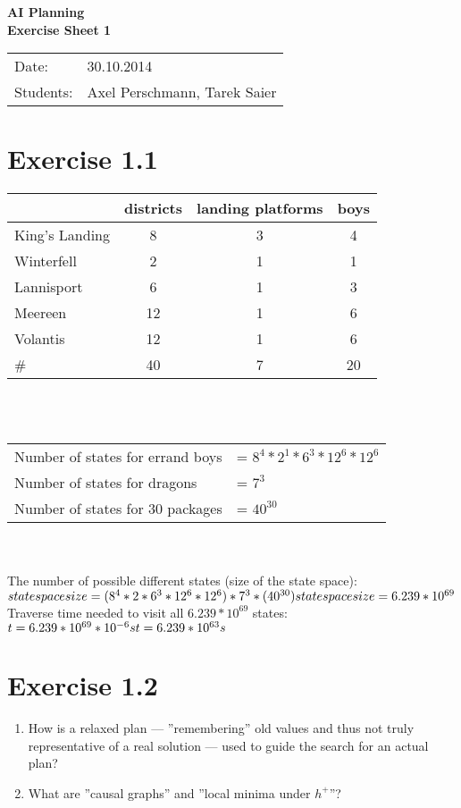 \documentclass[11pt,a4paper]{article}
\begin{document}
\begin{center}
\Huge{\textbf{AI Planning}}\\
\LARGE{\textbf{Exercise Sheet 1}}
\end{center}
\vspace{2cm}
\begin{tabular}{ll}
Date: & 30.10.2014\\
Students: & Axel Perschmann, Tarek Saier
\end{tabular}

\section*{Exercise 1.1}
\begin{tabular}{ l | c c c }
     & districts & landing platforms & boys \\
  \hline
  King's Landing &  8 & 3 & 4\\
  Winterfell &  2 & 1 & 1\\
  Lannisport &  6 & 1 & 3\\
  Meereen & 12 & 1 & 6\\
  Volantis & 12 & 1 & 6\\
  \hline
  \#  & 40 & 7 & 20
\end{tabular}\\\\

\begin{tabular}{ll}
Number of states for errand boys & = $8^4 * 2^1 * 6^3 * 12^6 * 12^6$ \\
Number of states for dragons & = $7^3$ \\
Number of states for 30 packages &= $40^{30}$
\end{tabular}\\\\

The number of possible different states (size of the state space):\\
$state space size = (8^4 * 2 * 6^3 * 12^6 * 12^6)  *  7^3  * (40^{30})\\
state space size= 6.239 * 10^{69}$\\

Traverse time needed to visit all $6.239 * 10^{69}$ states:\\
$t = 6.239 * 10^{69} * 10^{-6}s\\
t = 6.239 * 10^{63}s$

\section*{Exercise 1.2}

\begin{enumerate}
\item How is a relaxed plan --- ''remembering'' old values and thus not truly representative of a real solution --- used to guide the search for an actual plan?
\item What are ''causal graphs'' and ''local minima under $h^+$''?
\end{enumerate}
\end{document}
